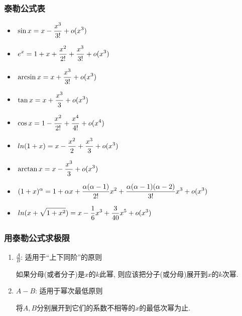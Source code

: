 \subsubsection{泰勒公式表}
\begin{multicols}{2}
    \begin{itemize}
    \item $ \displaystyle\hspace{.2em}\sin x=x-\frac{x^{3}}{3!}+o(x^{3}) $
    \item $ \displaystyle\hspace{.2em}e^{x}=1+x+\frac{x^{2}}{2!}+\frac{x^{3}}{3!}+o(x^{3}) $
    \item $ \displaystyle\hspace{.2em}\arcsin x=x+\frac{x^{3}}{3!}+o(x^{3}) $
    \item $ \displaystyle\hspace{.2em}\tan x=x+\frac{x^{3}}{3}+o(x^{3}) $
    \item $ \displaystyle\hspace{.2em}\cos x=1-\frac{x^{2}}{2!}+\frac{x^{4}}{4!}+o(x^{4}) $
    \item $ \displaystyle\hspace{.2em}ln(1+x)=x-\frac{x^{2}}{2}+\frac{x^{3}}{3}+o(x^{3}) $
    \item $ \displaystyle\hspace{.2em}\arctan x=x-\frac{x^{3}}{3}+o(x^{3}) $
    \item $ \displaystyle\hspace{.2em}(1+x)^{\alpha}=1+\alpha x+\frac{\alpha (\alpha -1)}{2!}x^{2}+\frac{\alpha (\alpha -1)(\alpha -2)}{3!}x^{3}+o(x^{3}) $
    \item $ \displaystyle\hspace{.2em}ln(x+\sqrt{1+x^2})=x-\frac{1}{6}x^3+\frac{3}{40}x^5+o(x^3) $
    \end{itemize}
\end{multicols}

\begin{figure}
    \centering %
\end{figure}



\subsubsection{用泰勒公式求极限}
\begin{enumerate}
\item $ \frac{A}{B} $: 适用于``上下同阶''的原则 \par
如果分母(或者分子)是$ x $的$ k $此幂, 则应该把分子(或分母)展开到$ x $的$ k $次幂.
\item $ A-B $: 适用于幂次最低原则 \par
将$ A, B $分别展开到它们的系数不相等的$ x $的最低次幂为止.
\end{enumerate}

